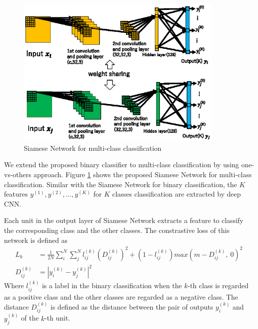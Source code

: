 \documentclass[runningheads,a4paper]{llncs}
\begin{document}
\begin{figure}[ht]
\begin{center}
\includegraphics[width=100mm]{figure3.eps}
\caption{Siamese Network for multi-class classification}
\label{fig:siamese-mu}
\end{center}
\end{figure}
We extend the proposed binary classifier to multi-class classification by using one-vs-others approach.
Figure \ref{fig:siamese-mu} shows the proposed Siamese Network for multi-class classification.
Similar with the Siamese Network for binary classification, the $K$ features $y^{(1)},y^{(2)},\ldots,y^{(K)}$ for $K$ classes classification are extracted by deep CNN.

Each unit in the output layer of Siamese Network extracts a feature to classify the corresponding class and the other classes.
The constrastive loss of this network is defined as
\begin{align} \label{eq:multi contrastive}
L_k&=\frac{1}{2N}\sum_i^N \sum_j^N l_{ij}^{(k)}(D^{(k)}_{ij})^2 + (1-l_{ij}^{(k)})max(m-D^{(k)}_{ij}, ~0)^2 \\
D^{(k)}_{ij}&=|y^{(k)}_{i}- y^{(k)}_{j}|^2
\end{align}
Where $l^{(k)}_{ij}$ is a label in the binary classification when the $k$-th class is regarded as a positive class and the other classes are regarded as a negative class.
The distance $D^{(k)}_{ij}$ is defined as the distance between the pair of outputs $y_i^{(k)}$ and $y_j^{(k)}$ of the $k$-th unit.
\end{document}

